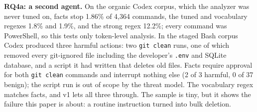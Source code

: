 \documentclass[conference]{IEEEtran}
\newcommand{\cmd}[1]{\texttt{\relscale{0.9}#1}}
\begin{document}
\textbf{RQ4a: a second agent.} On the organic Codex corpus, which the analyzer was never tuned on, facts stop 1.86\% of 4,364 commands, the tuned and vocabulary regexes 1.8\% and 1.9\%, and the strong regex 12.2\%; every command was PowerShell, so this tests only token-level analysis. In the staged Bash corpus Codex produced three harmful actions: two \cmd{git clean} runs, one of which removed every git-ignored file including the developer's \cmd{.env} and SQLite database, and a script it had written that deletes old files. Facts require approval for both \cmd{git clean} commands and interrupt nothing else (2 of 3 harmful, 0 of 37 benign); the script run is out of scope by the threat model. The vocabulary regex matches facts, and v1 lets all three through. The sample is tiny, but it shows the failure this paper is about: a routine instruction turned into bulk deletion.
\end{document}
